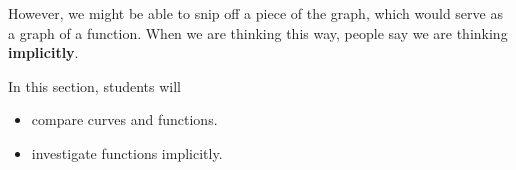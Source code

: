 \documentclass{ximera}
\begin{document}
However, we might be able to snip off a piece of the graph, which would serve as a graph of a function.  When we are thinking this way, people say we are thinking \textbf{implicitly}.







\begin{sectionOutcomes}
In this section, students will 

\begin{itemize}
\item compare curves and functions.
\item investigate functions implicitly.
\end{itemize}
\end{sectionOutcomes}
\end{document}
